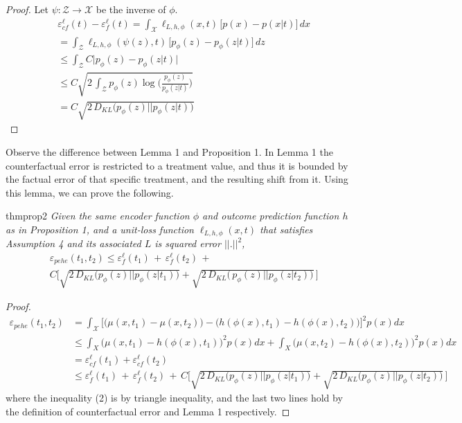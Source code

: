 \documentclass[letterpaper]{article} %
\begin{document}
\setcounter{equation}{0}
\begin{proof}
Let $\psi : \mathcal{Z} \rightarrow \mathcal{X}$ be the inverse of $\phi$.
    \begin{align}
        & \varepsilon_{cf}^{\ell}(t) -  \varepsilon_{f}^{\ell}(t) = \int_{\mathcal{X}} \ell_{L, h, \phi}(x, t)\, \big[p(x) - p(x|t) \big]\, dx \\
        &= \int_{\mathcal{Z}} \ell_{L, h, \phi}(\psi(z), t)\, \big[p_\phi(z) - p_\phi(z|t)\big] \,dz \\
        &\le \int_{\mathcal{Z}} C \big| p_\phi(z) - p_\phi(z|t)\big| \\
        &\le  C \sqrt{2\, \int_{\mathcal{Z}} p_{\phi}(z) \log\bigg(\frac{p_{\phi}(z)}{p_{\phi}(z|t)}\bigg)} \\
        &=  C \sqrt{2\,D_{KL}\bigg(p_{\phi}(z) || p_{\phi}(z|t)\bigg)}
    \end{align}
\end{proof}
Observe the difference between Lemma 1 and Proposition 1. In Lemma 1 the counterfactual error is restricted to a treatment value, and thus it is bounded by the factual error of that specific treatment, and the resulting shift from it. Using this lemma, we can prove the following.
\newline
\newline
\begin{restatable*}{thm}{prop2}
\textit{Given the same encoder function $\phi$ and outcome prediction function $h$ as in Proposition 1, and a unit-loss function $\ell_{L, h, \phi}(x, t)$ that satisfies Assumption 4 and its associated $L$ is squared error $||.||^2$,
\begin{align*}
   &\varepsilon_{pehe}(t_1, t_2) \le \varepsilon_f^{\ell}(t_1) \, + \, 
\varepsilon_f^{\ell}(t_2) \,  + \, \\
& C \Bigg[\sqrt{ 2 \, D_{KL}\bigg(p_{\phi}(z) || p_{\phi}(z|t_1)\bigg)} +
\sqrt{2\, D_{KL}\bigg(\, p_{\phi}(z) || p_{\phi}(z|t_2)\bigg)} \, \Bigg]
\end{align*}
}
\end{restatable*}
\setcounter{equation}{0}
\begin{proof}
    \begin{align}
        \varepsilon_{pehe}(t_1, t_2) &= \int_{\mathcal{X}} \big[ \big( \mu(x, t_1) - \mu(x, t_2) \big) - \big( h(\phi(x), t_1) - h(\phi(x), t_2) \big) \big]^2 p(x)dx \\
        & \le \int_{X} \big(\mu(x, t_1) -  h(\phi(x), t_1) \big)^2 p(x) dx + \int_X \big( \mu(x, t_2) -  h(\phi(x), t_2) \big)^2 p(x) dx \\
        &= \varepsilon_{cf}^\ell(t_1) + \varepsilon_{cf}^\ell(t_2) \\
        &\le \varepsilon_f^{\ell}(t_1) \, + \, 
        \varepsilon_f^{\ell}(t_2) \,  + \,
        C \Bigg[\sqrt{ 2 \, D_{KL}\bigg(p_{\phi}(z) || p_{\phi}(z|t_1)\bigg)} +
        \sqrt{2\, D_{KL}\bigg(p_{\phi}(z) || p_{\phi}(z|t_2)\bigg)} \, \Bigg]
    \end{align}
    where the inequality (2) is by triangle inequality, and the last two lines hold by the definition of counterfactual error and Lemma 1 respectively.
\end{proof}
\end{document}

